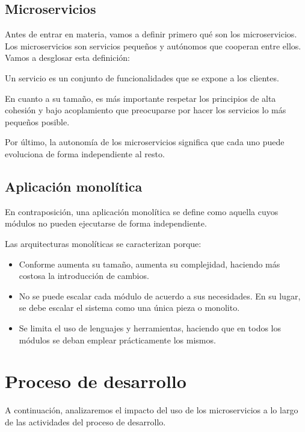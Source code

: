 \documentclass[11pt,a4paper]{article}
\begin{document}
\subsection{Microservicios}

Antes de entrar en materia, vamos a definir primero qué son los microservicios. Los microservicios son servicios pequeños y autónomos que cooperan entre ellos. Vamos a desglosar esta definición:

Un servicio es un conjunto de funcionalidades que se expone a los clientes.

En cuanto a su tamaño, es más importante respetar los principios de alta cohesión y bajo acoplamiento que preocuparse por hacer los servicios lo más pequeños posible.

Por último, la autonomía de los microservicios significa que cada uno puede evoluciona de forma independiente al resto.


\subsection{Aplicación monolítica}

En contraposición, una aplicación monolítica se define como aquella cuyos módulos no pueden ejecutarse de forma independiente.

Las arquitecturas monolíticas se caracterizan porque:
\begin{itemize}

\item Conforme aumenta su tamaño, aumenta su complejidad, haciendo más costosa la introducción de cambios.

\item No se puede escalar cada módulo de acuerdo a sus necesidades. En su lugar, se debe escalar el sistema como una única pieza o monolito.

\item Se limita el uso de lenguajes y herramientas, haciendo que en todos los módulos se deban emplear prácticamente los mismos.

\end{itemize}

\section{Proceso de desarrollo}

A continuación, analizaremos el impacto del uso de los microservicios a lo largo de las actividades del proceso de desarrollo.
\end{document}
